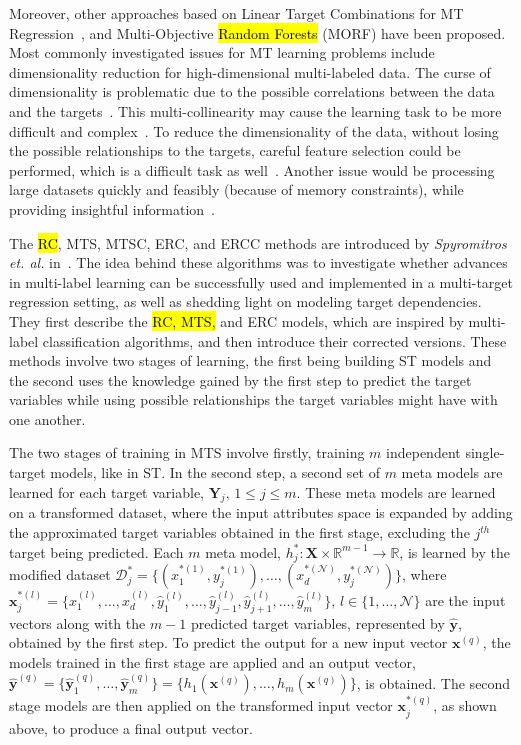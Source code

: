 \documentclass[preprint,12pt]{elsarticle}
\begin{document}
Moreover, other approaches based on Linear Target Combinations for MT Regression~\cite{Tsoumakas2014}, and Multi-Objective  \hl{Random Forests} (MORF) \cite{Kocev2007} have been proposed. Most commonly investigated issues for MT learning problems include dimensionality reduction for high-dimensional multi-labeled data. The curse of dimensionality is problematic due to the possible correlations between the data and the targets~\cite{Charte20141842,Ding20152521,He2011}. This multi-collinearity may cause the learning task to be more difficult and complex~\cite{Qian2015594}. To reduce the dimensionality of the data, without losing the possible relationships to the targets, careful feature selection could be performed, which is a difficult task as well~\cite{Lee201580,Li2016827}. Another issue would be processing large datasets quickly and feasibly (because of memory constraints), while providing insightful information~\cite{Borchani2015, 2016-INS-LAIM}.

The \hl{RC}, MTS, MTSC, ERC, and ERCC methods are introduced by \textit{Spyromitros et. al.} in~\cite{Spyromitros2014}. The idea behind these algorithms was to investigate whether advances in multi-label learning can be successfully used and implemented in a multi-target regression setting, as well as shedding light on modeling target dependencies. They first describe the \hl{RC, MTS,} and ERC models, which are  inspired by multi-label classification algorithms, and then introduce their corrected versions. These  methods involve two stages of learning, the first being building ST models and the second uses the knowledge gained by the first step to predict the target variables while using possible relationships the target variables might have with one another. 

The two stages of training in MTS involve firstly, training $m$ independent single-target models, like in ST. In the second step, a second set of $m$ meta models are learned for each target variable, $\bm{Y}_j,\, 1 \leq j \leq m$. These meta models are learned on a transformed dataset, where the input attributes space is expanded by adding the approximated target variables obtained in the first stage, excluding the $j^{th}$ target being predicted. Each $m$ meta model, $h_j^* : \bm{X} \times \mathbb{R}^{m-1} \rightarrow \mathbb{R}$, is learned by the modified dataset $\mathcal{D}_j^* = \{(x_1^{*(1)},y_j^{*(1)}), \ldots, (x_d^{*(\mathcal{N})},y_j^{*(\mathcal{N})})\}$, where $\bm x_j^{*(l)} = \{x_1^{(l)}, \ldots, x_d^{(l)}, \hat{y}_1^{(l)}, \ldots, \hat{y}_{j-1}^{(l)}, \hat{y}_{j+1}^{(l)}, \ldots, \hat{y}_m^{(l)}\},\, l \in \{1, \ldots, \mathcal{N}\}$ are the input vectors along with the $m-1$ predicted target variables, represented by $\hat{\bm y}$, obtained by the first step. To predict the output for a new input vector $\bm{x}^{(q)}$, the models trained in the first stage are applied and an output vector, $\hat{\bm{y}}^{(q)} = \{\hat{\bm{y}}_1^{(q)}, \ldots, \hat{\bm{y}}_m^{(q)}\} = \{h_1(\bm{x}^{(q)}), \ldots, h_m(\bm{x}^{(q)})\}$, is obtained. The second stage models are then applied on the transformed input vector $\bm x_j^{*(q)}$, as shown above, to produce a final output vector.
\end{document}
